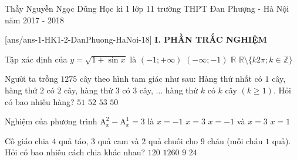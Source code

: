 \begin{name}
{Thầy Nguyễn Ngọc Dũng}
{Học kì 1 lớp 11 trường THPT Đan Phượng - Hà Nội năm 2017 - 2018}
\end{name}
\setcounter{ex}{0}\setcounter{bt}{0}
[ans/ans-1-HK1-2-DanPhuong-HaNoi-18]
\noindent\textbf{I. PHẦN TRẮC NGHIỆM}
\begin{ex}%
Tập xác định của $y=\sqrt{1+\sin x}$ là
\choice
{$(-1;+\infty)$}
{$(-\infty;-1)$}
{\True $\mathbb{R}$}
{$\mathbb{R} \setminus \{k2\pi;k \in \mathbb{Z}\}$}
\end{ex}

\begin{ex}%
Người ta trồng $1275$ cây theo hình tam giác như sau: Hàng thứ nhất có $1$ cây, hàng thứ $2$ có $2$ cây, hàng thứ $3$ có $3$ cây, $\ldots$ hàng thứ $k$ có $k$ cây $(k\ge 1)$. Hỏi có bao nhiêu hàng?
\choice
{$51$}
{$52$}
{$53$}
{\True $50$}
\end{ex}

\begin{ex}%
Nghiệm của phương trình $\mathrm{A}_x^2-\mathrm{A}_x^1=3$ là
\choice
{$x=-1$}
{\True $x=3$}
{$x=-1$ và $x=3$}
{$x=1$}
\end{ex}

\begin{ex}%
Cô giáo chia $4$ quả táo, $3$ quả cam và $2$ quả chuối cho $9$ cháu (mỗi cháu $1$ quả). Hỏi có bao nhiêu cách chia khác nhau?
\choice
{$120$}
{\True $1260$}
{$9$}
{$24$}
\end{ex}

